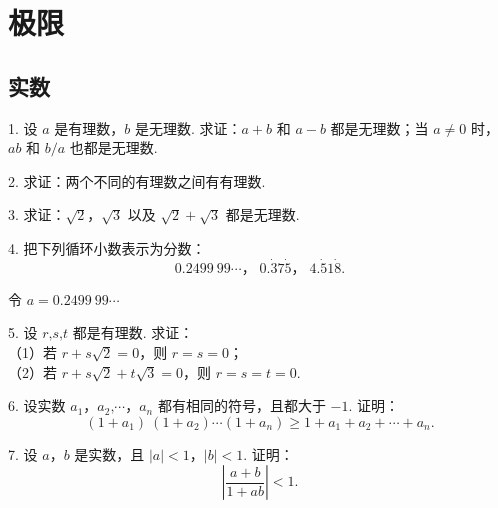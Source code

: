 \documentclass[12pt, a4paper, oneside, UTF8]{ctexbook}
\begin{document}

\fi

\chapter{极限}

\section{实数}

1. 设 $a$ 是有理数，$b$ 是无理数. 求证：$a + b$ 和 $a - b$ 都是无理数；当 $a \neq 0$ 时，$ab$ 和 $b/a$ 也都是无理数.

\begin{solution}

\end{solution}

2. 求证：两个不同的有理数之间有有理数.

3. 求证：$\sqrt{2}$，$\sqrt{3}$ 以及 $\sqrt{2} + \sqrt{3}$ 都是无理数.

4. 把下列循环小数表示为分数：
\[ 0.2499\ 99\cdots\text{，}\;0.\dot{3}7\dot{5}\text{，}\;4.\dot{5}1\dot{8} . \]

\begin{solution}
令 $a = 0.2499\ 99\cdots$
\end{solution}

5. 设 $r\text{,}s\text{,}t$ 都是有理数. 求证：\\
\indent（1）若 $r + s\sqrt{2} = 0$，则 $r = s = 0$；\\
\indent（2）若 $r + s\sqrt{2} + t\sqrt{3} = 0$，则 $r = s = t = 0$.

6. 设实数 $a_1\text{，}a_2\text{,}\cdots\text{，}a_n$ 都有相同的符号，且都大于 $-1$. 证明：
\[ (1 + a_1)\ (1 + a_2) \cdots (1 + a_n) \geq 1 + a_1 + a_2 + \cdots + a_n . \]

7. 设 $a\text{，}b$ 是实数，且 $|a| < 1\text{，}|b| < 1$. 证明：
\[ \left| \frac{a + b}{1 + ab} \right| < 1 . \]

\ifx\allfiles\undefined
\end{document}
